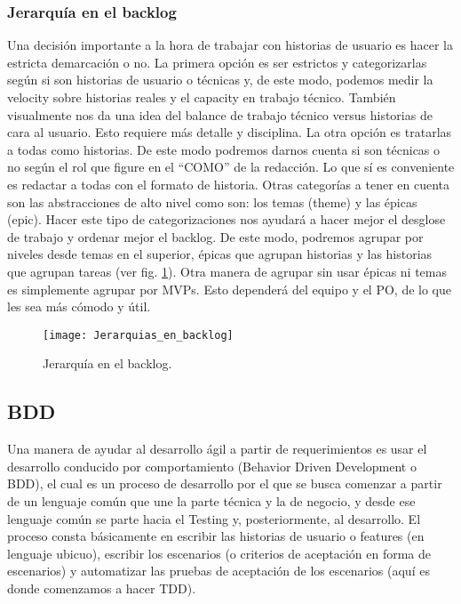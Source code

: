 \subsubsection{Jerarquía en el backlog}

Una decisión importante a la hora de trabajar con historias de usuario es hacer la estricta demarcación o no. La primera opción es ser estrictos y categorizarlas según si son historias de usuario o técnicas y, de este modo, podemos medir la velocity sobre historias reales y el capacity en trabajo técnico. También visualmente nos da una idea del balance de trabajo técnico versus historias de cara al usuario. Esto requiere más detalle y disciplina. La otra opción es tratarlas a todas como historias. De este modo podremos darnos cuenta si son técnicas o no según el rol que figure en el “COMO” de la redacción. Lo que sí es conveniente es redactar a todas con el formato de historia.
Otras categorías a tener en cuenta son las abstracciones de alto nivel como son: los temas (theme) y las épicas (epic). Hacer este tipo de categorizaciones nos ayudará a hacer mejor el desglose de trabajo y ordenar mejor el backlog. De este modo, podremos agrupar por niveles desde temas en el superior, épicas que agrupan historias y las historias que agrupan tareas (ver fig. \ref{fig:Jerarquias_en_backlog}). Otra manera de agrupar sin usar épicas ni temas es simplemente agrupar por MVPs. Esto dependerá del equipo y el PO, de lo que les sea más cómodo y útil.

\begin{figure}[h]
  \centering
  \texttt{[image: Jerarquias\_en\_backlog]}
  \caption{Jerarquía en el backlog.}
  \centering
  \label{fig:Jerarquias_en_backlog} %
\end{figure}

\subsection{BDD}

Una manera de ayudar al desarrollo ágil a partir de requerimientos es usar el desarrollo conducido por comportamiento (Behavior Driven Development o BDD), el cual es un proceso de desarrollo por el que se busca comenzar a partir de un lenguaje común que une la parte técnica y la de negocio, y desde ese lenguaje común se parte hacia el Testing y, posteriormente, al desarrollo. El proceso consta básicamente en escribir las historias de usuario o features (en lenguaje ubicuo), escribir los escenarios (o criterios de aceptación en forma de escenarios) y automatizar las pruebas de aceptación de los escenarios (aquí es donde comenzamos a hacer TDD).


